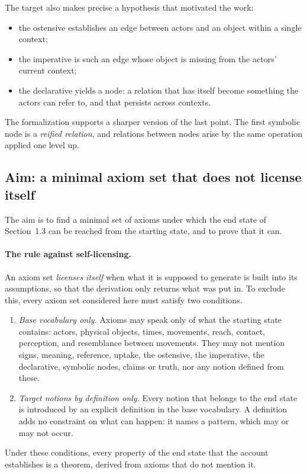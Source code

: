 \documentclass[11pt]{article}
\begin{document}
The target also makes precise a hypothesis that motivated the work:
\begin{itemize}[nosep]
  \item the ostensive establishes an edge between actors and an object within a single
    context;
  \item the imperative is such an edge whose object is missing from the actors' current
    context;
  \item the declarative yields a node: a relation that has itself become something the
    actors can refer to, and that persists across contexts.
\end{itemize}
The formalization supports a sharper version of the last point. The first symbolic node
is a \emph{reified relation}, and relations between nodes arise by the same operation
applied one level up.

\subsection{Aim: a minimal axiom set that does not license itself}

The aim is to find a minimal set of axioms under which the end state of
Section~1.3 can be reached from the starting state, and to prove that it can.

\paragraph{The rule against self-licensing.}
An axiom set \emph{licenses itself} when what it is supposed to generate is built into its
assumptions, so that the derivation only returns what was put in. To exclude this, every
axiom set considered here must satisfy two conditions.
\begin{enumerate}
  \item \emph{Base vocabulary only.} Axioms may speak only of what the starting state
    contains: actors, physical objects, times, movements, reach, contact, perception, and
    resemblance between movements. They may not mention signs, meaning, reference,
    uptake, the ostensive, the imperative, the declarative, symbolic nodes, claims or
    truth, nor any notion defined from these.
  \item \emph{Target notions by definition only.} Every notion that belongs to the end
    state is introduced by an explicit definition in the base vocabulary. A definition
    adds no constraint on what can happen: it names a pattern, which may or may not
    occur.
\end{enumerate}
Under these conditions, every property of the end state that the account establishes is a
theorem, derived from axioms that do not mention it.
\end{document}
